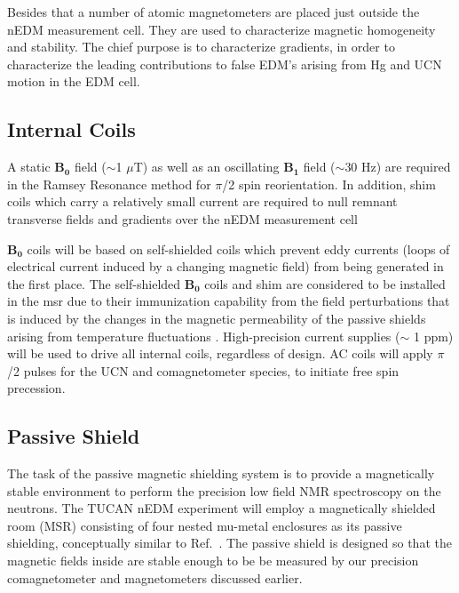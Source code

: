 Besides that a number of atomic magnetometers are placed just outside the
nEDM measurement cell. They are used to characterize magnetic homogeneity and stability. The chief purpose is to characterize gradients, in order to characterize the leading contributions to false EDM's arising from Hg and UCN motion in the EDM cell.

\subsection{Internal Coils}

A static $\bm{B_0}$ field ($\sim$1 $\mu$T) as well as an oscillating $\bm{B_1}$ field ($\sim$30 Hz) are required in the Ramsey Resonance method for $\pi$/2 spin reorientation. In addition, shim coils which carry a relatively small current are required to null remnant transverse fields and gradients over the nEDM measurement cell

$\bm{B_0}$ coils will be based on self-shielded coils which prevent eddy currents (loops of electrical current induced by a changing magnetic field) from being generated in the first place. The self-shielded $\bm{B_0}$ coils and shim are considered to be installed in the msr due to their immunization capability from the field perturbations that is induced by the changes in the magnetic permeability of the passive shields arising from temperature fluctuations \cite{Andalib_temp}. High-precision current supplies ($\sim$ 1 ppm) will be used to drive all internal coils, regardless of design. AC coils will apply $\pi$/2 pulses for the UCN and comagnetometer species, to initiate free spin precession.



\subsection{Passive Shield}\label{sec:passive}
The task of the passive magnetic shielding system is to provide a magnetically stable environment to perform the precision low field NMR spectroscopy on the neutrons. The TUCAN nEDM experiment will employ a magnetically shielded room (MSR) consisting of four nested mu-metal enclosures as its passive shielding, conceptually similar to Ref.~\cite{msr_design}.  The passive shield is designed so that the magnetic fields inside are stable enough to be be measured by
our precision comagnetometer and magnetometers discussed earlier. 


